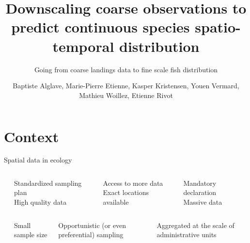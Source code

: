 \documentclass[
  10pt,
  ignorenonframetext,
]{beamer}
\institute{04/2022 - RESSTE}
\title{Downscaling coarse observations to predict continuous species
spatio-temporal distribution}
\subtitle{Going from coarse landings data to fine scale fish distribution}
\author{Baptiste Alglave, Marie-Pierre Etienne, Kasper Kristensen, Youen
Vermard, Mathieu Woillez, Etienne Rivot}
\date{}
\begin{document}
\frame{\titlepage}

\hypertarget{context}{%
\section{Context}\label{context}}

\begin{frame}{Spatial data in ecology}
\protect\hypertarget{spatial-data-in-ecology}{}

\begin{columns}
\begin{column}{0.1\textwidth}
\end{column}
\begin{column}{0.3\textwidth}
\end{column}
\begin{column}{0.3\textwidth}
\end{column}
\begin{column}{0.3\textwidth}
\end{column}
\end{columns}

\vspace{\baselineskip}

\begin{columns}
\begin{column}{0.1\textwidth}
\center \Huge \textbf{\textcolor{BaptisteBlue}{}}
\normalsize
\end{column}
\begin{column}{0.3\textwidth}
\normalsize
Standardized sampling plan \\
High quality data
\end{column}
\begin{column}{0.3\textwidth}
Access to more data \\
Exact locations available
\end{column}
\begin{column}{0.3\textwidth}
Mandatory declaration \\
Massive data
\end{column}
\end{columns}

\vspace{\baselineskip}

\begin{columns}
\begin{column}{0.1\textwidth}
\center \Huge \fontsize{45}{15}{\textbf{\textcolor{BaptisteBlue}{-}}}
\normalsize
\end{column}
\begin{column}{0.3\textwidth}
\normalsize
Small sample size
\end{column}
\begin{column}{0.3\textwidth}
Opportunistic (or even preferential) sampling
\end{column}
\begin{column}{0.3\textwidth}
Aggregated at the scale of administrative units
\end{column}
\end{columns}


\end{frame}
\end{document}
